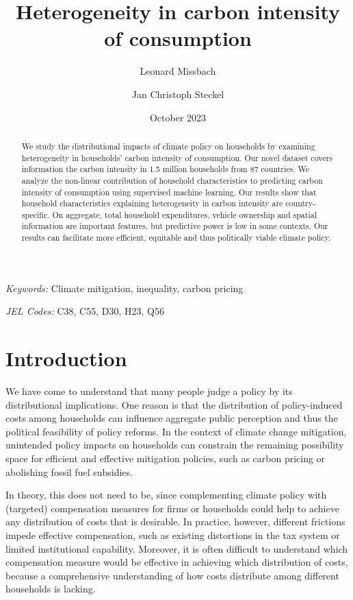 \documentclass[12pt, a4paper]{article}
\title{Heterogeneity in carbon intensity of consumption}
\author[1,2,*]{Leonard Missbach}
\author[1,3]{Jan Christoph Steckel}
\affil[1]{\small Mercator Research Institute on Global Commons and Climate Change, Berlin, Germany}
\affil[2]{\small Technical University of Berlin, Berlin, Germany}
\affil[3]{\small Brandenburg University of Technology Cottbus Senftenberg, Cottbus, Germany}
\affil[*]{\normalsize Corresponding author: \href{mailto:missbach@mcc-berlin.net}{missbach@mcc-berlin.net}}
\date{October 2023}
\begin{document}
\maketitle
\begin{abstract}
  We study the distributional impacts of climate policy on households by examining heterogeneity in households' carbon intensity of consumption. Our novel dataset covers information the carbon intensity in 1.5 million households from 87 countries. We analyze the non-linear contribution of household characteristics to predicting carbon intensity of consumption using supervised machine learning.
   Our results show that household characteristics explaining heterogeneity in carbon intensity are country-specific. On aggregate, total household expenditures, vehicle ownership and spatial information are important features, but predictive power is low in some contexts. Our results can facilitate more efficient, equitable and thus politically viable climate policy.   
\end{abstract}

\smallskip

\noindent \small \textit{Keywords:} Climate mitigation, inequality, carbon pricing

\noindent \small \textit{JEL Codes:} C38, C55, D30, H23, Q56

\thispagestyle{empty}
\clearpage
\setcounter{page}{1}

\section{Introduction} \label{sec:introduction}

We have come to understand that many people judge a policy by its distributional implications. One reason is that the distribution of policy-induced costs among households can influence aggregate public perception and thus the political feasibility of policy reforms. In the context of climate change mitigation, unintended policy impacts on households can constrain the remaining possibility space for efficient and effective mitigation policies, such as carbon pricing or abolishing fossil fuel subsidies.

In theory, this does not need to be, since complementing climate policy with (targeted) compensation measures for firms or households could help to achieve any distribution of costs that is desirable. In practice, however, different frictions impede effective compensation, such as existing distortions in the tax system or limited institutional capability. Moreover, it is often difficult to understand which compensation measure would be effective in achieving which distribution of costs, because a comprehensive understanding of how costs distribute among different households is lacking.
\end{document}
